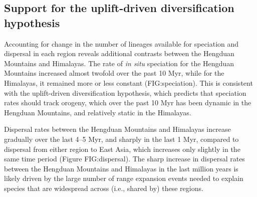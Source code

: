 \subsection{Support for the uplift-driven diversification hypothesis}

Accounting for change in the number of lineages available for speciation and dispersal in each region reveals additional contrasts between the Hengduan Mountains and Himalayas. The rate of \textit{in situ} speciation for the Hengduan Mountains increased almost twofold over the past 10 Myr, while for the Himalayas, it remained more or less constant (FIG:speciation). This is consistent with the uplift-driven diversification hypothesis, which predicts that speciation rates should track orogeny, which over the past 10 Myr has been dynamic in the Hengduan Mountains, and relatively static in the Himalayas.

Dispersal rates between the Hengduan Mountains and Himalayas increase gradually over the last 4--5 Myr, and sharply in the last 1 Myr, compared to dispersal from either region to East Asia, which increases only slightly in the same time period (Figure FIG:dispersal). The sharp increase in dispersal rates between the Hengduan Mountains and Himalayas in the last million years is likely driven by the large number of range expansion events needed to explain species that are widespread across (i.e., shared by) these regions.